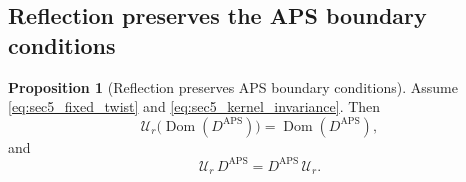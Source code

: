 \documentclass[11pt]{article}
\theoremstyle{definition}
\newtheorem{proposition}[theorem]{Proposition}
\DeclareMathOperator{\APS}{APS}
\DeclareMathOperator{\Dom}{Dom} \newcommand{\Z}{\mathbb{Z}} \DeclareMathOperator{\Ran}{Ran}
\numberwithin{equation}{section}
\begin{document}
\subsection{Reflection preserves the APS boundary conditions}

\begin{proposition}[Reflection preserves APS boundary conditions]
\label{prop:sec5_reflection_preserves_APS_zero_mode}
Assume \eqref{eq:sec5_fixed_twist} and \eqref{eq:sec5_kernel_invariance}. Then
\begin{equation}\label{eq:sec5_domain_preservation}
\mathcal U_r\bigl(\Dom(D^{\APS})\bigr)=\Dom(D^{\APS}),
\end{equation}
and
\begin{equation}\label{eq:sec5_operator_commutation}
\mathcal U_r\,D^{\APS}=D^{\APS}\,\mathcal U_r.
\end{equation}
\end{proposition}
\end{document}
